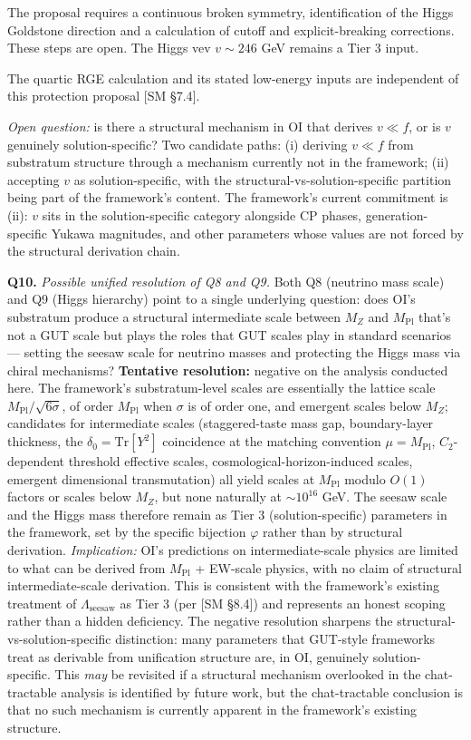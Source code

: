 \documentclass[
]{article}
\begin{document}
The proposal requires a continuous broken symmetry, identification of
the Higgs Goldstone direction and a calculation of cutoff and
explicit-breaking corrections. These steps are open. The Higgs vev
\(v\sim 246\) GeV remains a Tier 3 input.

The quartic RGE calculation and its stated low-energy inputs are
independent of this protection proposal {[}SM §7.4{]}.

\emph{Open question:} is there a structural mechanism in OI that derives
\(v \ll f\), or is \(v\) genuinely solution-specific? Two candidate
paths: (i) deriving \(v \ll f\) from substratum structure through a
mechanism currently not in the framework; (ii) accepting \(v\) as
solution-specific, with the structural-vs-solution-specific partition
being part of the framework's content. The framework's current
commitment is (ii): \(v\) sits in the solution-specific category
alongside CP phases, generation-specific Yukawa magnitudes, and other
parameters whose values are not forced by the structural derivation
chain.

\textbf{Q10.} \emph{Possible unified resolution of Q8 and Q9.} Both Q8
(neutrino mass scale) and Q9 (Higgs hierarchy) point to a single
underlying question: does OI's substratum produce a structural
intermediate scale between \(M_Z\) and \(M_{\mathrm{Pl}}\) that's not a
GUT scale but plays the roles that GUT scales play in standard scenarios
--- setting the seesaw scale for neutrino masses and protecting the
Higgs mass via chiral mechanisms? \textbf{Tentative resolution:}
negative on the analysis conducted here. The framework's
substratum-level scales are essentially the lattice scale
\(M_{\mathrm{Pl}}/\sqrt{6\sigma}\), of order \(M_{\mathrm{Pl}}\) when
\(\sigma\) is of order one, and emergent scales below \(M_Z\);
candidates for intermediate scales (staggered-taste mass gap,
boundary-layer thickness, the \(\delta_0 = \mathrm{Tr}[Y^2]\)
coincidence at the matching convention \(\mu = M_{\mathrm{Pl}}\),
\(C_2\)-dependent threshold effective scales,
cosmological-horizon-induced scales, emergent dimensional transmutation)
all yield scales at \(M_{\mathrm{Pl}}\) modulo \(O(1)\) factors or
scales below \(M_Z\), but none naturally at \(\sim 10^{16}\) GeV. The
seesaw scale and the Higgs mass therefore remain as Tier 3
(solution-specific) parameters in the framework, set by the specific
bijection \(\varphi\) rather than by structural derivation.
\emph{Implication:} OI's predictions on intermediate-scale physics are
limited to what can be derived from \(M_{\mathrm{Pl}}\) + EW-scale
physics, with no claim of structural intermediate-scale derivation. This
is consistent with the framework's existing treatment of
\(\Lambda_{\mathrm{seesaw}}\) as Tier 3 (per {[}SM §8.4{]}) and
represents an honest scoping rather than a hidden deficiency. The
negative resolution sharpens the structural-vs-solution-specific
distinction: many parameters that GUT-style frameworks treat as
derivable from unification structure are, in OI, genuinely
solution-specific. This \emph{may} be revisited if a structural
mechanism overlooked in the chat-tractable analysis is identified by
future work, but the chat-tractable conclusion is that no such mechanism
is currently apparent in the framework's existing structure.
\end{document}
